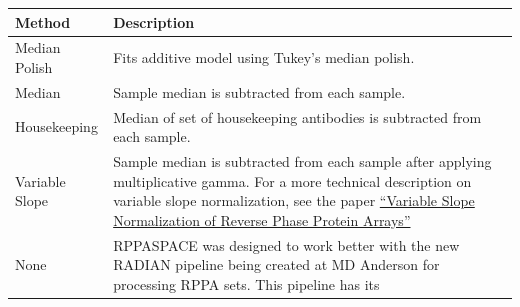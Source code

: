 \documentclass[
]{article}
\begin{document}
\begin{longtable}[]{@{}ll@{}}
\toprule
\begin{minipage}[b]{0.37\columnwidth}\raggedright
Method\strut
\end{minipage} & \begin{minipage}[b]{0.57\columnwidth}\raggedright
Description\strut
\end{minipage}\tabularnewline
\midrule
\endhead
\begin{minipage}[t]{0.37\columnwidth}\raggedright
Median Polish\strut
\end{minipage} & \begin{minipage}[t]{0.57\columnwidth}\raggedright
Fits additive model using Tukey's median polish.\strut
\end{minipage}\tabularnewline
\begin{minipage}[t]{0.37\columnwidth}\raggedright
Median\strut
\end{minipage} & \begin{minipage}[t]{0.57\columnwidth}\raggedright
Sample median is subtracted from each sample.\strut
\end{minipage}\tabularnewline
\begin{minipage}[t]{0.37\columnwidth}\raggedright
Housekeeping\strut
\end{minipage} & \begin{minipage}[t]{0.57\columnwidth}\raggedright
Median of set of housekeeping antibodies is subtracted from each
sample.\strut
\end{minipage}\tabularnewline
\begin{minipage}[t]{0.37\columnwidth}\raggedright
Variable Slope\strut
\end{minipage} & \begin{minipage}[t]{0.57\columnwidth}\raggedright
Sample median is subtracted from each sample after applying
multiplicative gamma. For a more technical description on variable slope
normalization, see the paper
\href{http://dx.doi.org/10.1093/bioinformatics/btp174}{``Variable Slope
Normalization of Reverse Phase Protein Arrays''}\strut
\end{minipage}\tabularnewline
\begin{minipage}[t]{0.37\columnwidth}\raggedright
None\strut
\end{minipage} & \begin{minipage}[t]{0.57\columnwidth}\raggedright
RPPASPACE was designed to work better with the new RADIAN pipeline being
created at MD Anderson for processing RPPA sets. This pipeline has its

\end{minipage}
\end{longtable}
\end{document}
